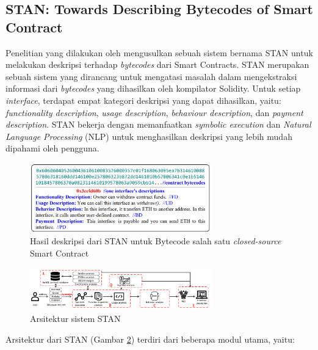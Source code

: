 \subsection{STAN: Towards Describing Bytecodes of Smart Contract}
\label{subsec:stan}

Penelitian yang dilakukan oleh \cite{stan} mengusulkan sebuah sistem bernama STAN untuk melakukan deskripsi terhadap \textit{bytecodes} dari Smart Contracts. STAN merupakan sebuah sistem yang dirancang untuk mengatasi masalah dalam mengekstraksi informasi dari \textit{bytecodes} yang dihasilkan oleh kompilator Solidity. Untuk setiap \textit{interface}, terdapat empat kategori deskripsi yang dapat dihasilkan, yaitu: \textit{functionality description}, \textit{usage description}, \textit{behaviour description}, dan \textit{payment description}. STAN bekerja dengan memanfaatkan \textit{symbolic execution} dan \textit{Natural Language Processing} (NLP) untuk menghasilkan deskripsi yang lebih mudah dipahami oleh pengguna.

\begin{figure}[ht]
	\centering
	\includegraphics[width=0.7\textwidth]{resources/chapter-2/stan-desc.png}
	\caption{Hasil deskripsi dari STAN untuk Bytecode salah satu \textit{closed-source} Smart Contract \parencite{stan}}
	\label{image:stan-desc}
\end{figure}

\begin{figure}[ht]
	\centering
	\includegraphics[width=0.7\textwidth]{resources/chapter-2/stan-architecture.png}
	\caption{Arsitektur sistem STAN \parencite{stan}}
	\label{image:stan-architecture}
\end{figure}

Arsitektur dari STAN (Gambar \ref{image:stan-architecture}) terdiri dari beberapa modul utama, yaitu:


